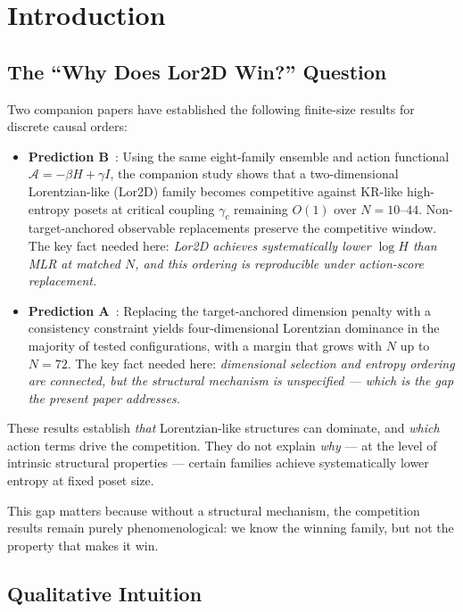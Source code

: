 \documentclass[entropy,article,submit,pdftex,moreauthors]{Definitions/mdpi}
\begin{document}
\section{Introduction}

\subsection{The ``Why Does Lor2D Win?'' Question}

Two companion papers have established the following finite-size results for discrete causal orders:

\begin{itemize}[nosep]
    \item \textbf{Prediction B}~\cite{zhang2026predB}: Using the same eight-family ensemble and action functional $\mathcal{A} = -\beta H + \gamma I$, the companion study shows that a two-dimensional Lorentzian-like (Lor2D) family becomes competitive against KR-like high-entropy posets at critical coupling $\gamma_c$ remaining $O(1)$ over $N = 10$--$44$. Non-target-anchored observable replacements preserve the competitive window. The key fact needed here: \emph{Lor2D achieves systematically lower $\log H$ than MLR at matched $N$, and this ordering is reproducible under action-score replacement.}

    \item \textbf{Prediction A}~\cite{zhang2026predA}: Replacing the target-anchored dimension penalty with a consistency constraint yields four-dimensional Lorentzian dominance in the majority of tested configurations, with a margin that grows with $N$ up to $N = 72$. The key fact needed here: \emph{dimensional selection and entropy ordering are connected, but the structural mechanism is unspecified --- which is the gap the present paper addresses.}
\end{itemize}

These results establish \emph{that} Lorentzian-like structures can dominate, and \emph{which} action terms drive the competition. They do not explain \emph{why} --- at the level of intrinsic structural properties --- certain families achieve systematically lower entropy at fixed poset size.

This gap matters because without a structural mechanism, the competition results remain purely phenomenological: we know the winning family, but not the property that makes it win.

\subsection{Qualitative Intuition}
\end{document}
